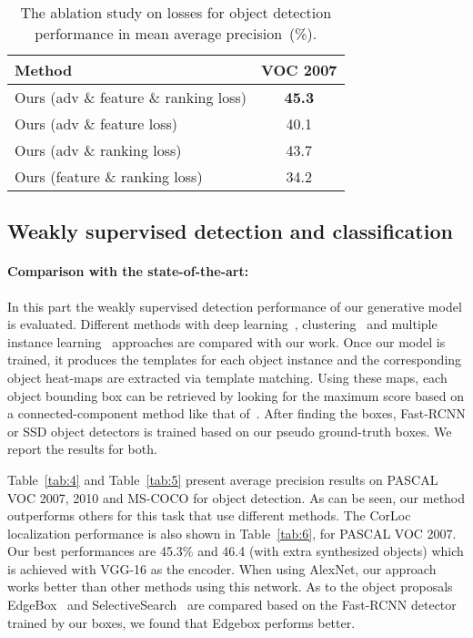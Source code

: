 \documentclass[runningheads]{llncs}
\begin{document}
\begin{table}[t]
{\small
\tabcolsep=0.3cm
\caption{The ablation study on losses for object detection performance in mean average precision~(\%).}
\label{tab:3}
\begin{center}
\begin{tabular}{lc}
\toprule
Method & VOC 2007\\
\midrule
Ours (adv \& feature \& ranking loss) & \textbf{45.3}    \\
Ours (adv \& feature loss) & 40.1    \\
Ours (adv \& ranking loss) &  43.7   \\
Ours (feature \& ranking loss) & 34.2   \\
\bottomrule
\end{tabular}
\end{center}}
\vspace{-0.8cm}
\end{table}


\subsection{Weakly supervised detection and classification}
\paragraph*{Comparison with the state-of-the-art:} In this part the weakly supervised detection performance of our generative model is evaluated. Different methods with deep learning~\cite{bilen16,li16}, clustering~\cite{bilen15} and multiple instance learning~\cite{cinbis} approaches are compared with our work. Once our model is trained, it produces the templates for each object instance and the corresponding object heat-maps are extracted via template matching. Using these maps, each object bounding box can be retrieved by looking for the maximum score based on a connected-component method like that of~\cite{gap}. After finding the boxes, Fast-RCNN or SSD object detectors is trained based on our pseudo ground-truth boxes. We report the results for both.  

Table~\ref{tab:4} and Table~\ref{tab:5} present average precision results on PASCAL VOC 2007, 2010 and MS-COCO for object detection. As can be seen, our method outperforms others for this task that use different methods. The {CorLoc} localization performance is also shown in Table~\ref{tab:6}, for PASCAL VOC 2007. Our best performances are 45.3\% and 46.4 (with extra synthesized objects) which is achieved with VGG-16 as the encoder. When using AlexNet, our approach works better than other methods using this network. As to the object proposals EdgeBox~\cite{edgebox} and SelectiveSearch~\cite{SS} are compared based on the Fast-RCNN detector trained by our boxes, we found that Edgebox performs better.
\end{document}
